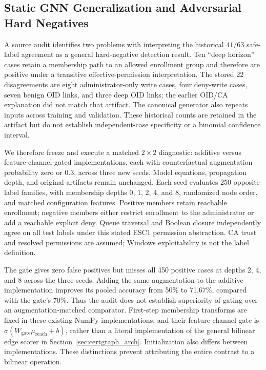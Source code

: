 \subsection{Static GNN Generalization and Adversarial Hard Negatives}
A source audit identifies two problems with interpreting the historical $41/63$ safe-label agreement as a general hard-negative detection result. Ten ``deep horizon'' cases retain a membership path to an allowed enrollment group and therefore are positive under a transitive effective-permission interpretation. The stored 22 disagreements are eight administrator-only write cases, four deny-write cases, seven benign OID links, and three deep OID links; the earlier OID/CA explanation did not match that artifact. The canonical generator also repeats inputs across training and validation. These historical counts are retained in the artifact but do not establish independent-case specificity or a binomial confidence interval.

We therefore freeze and execute a matched $2\times2$ diagnostic: additive versus feature-channel-gated implementations, each with counterfactual augmentation probability zero or 0.3, across three new seeds. Model equations, propagation depth, and original artifacts remain unchanged. Each seed evaluates 250 opposite-label families, with membership depths 0, 1, 2, 4, and 8, randomized node order, and matched configuration features. Positive members retain reachable enrollment; negative members either restrict enrollment to the administrator or add a reachable explicit deny. Queue traversal and Boolean closure independently agree on all test labels under this stated ESC1 permission abstraction. CA trust and resolved permissions are assumed; Windows exploitability is not the label definition.



The gate gives zero false positives but misses all 450 positive cases at depths 2, 4, and 8 across the three seeds. Adding the same augmentation to the additive implementation improves its pooled accuracy from 50\% to 71.67\%, compared with the gate's 70\%. Thus the audit does not establish superiority of gating over an augmentation-matched comparator. First-step membership transforms are fixed in these existing NumPy implementations, and their feature-channel gate is $\sigma(W_{\mathrm{gate}}\mu_{\mathrm{reach}}+b)$, rather than a literal implementation of the general bilinear edge scorer in Section~\ref{sec:certgraph_arch}. Initialization also differs between implementations. These distinctions prevent attributing the entire contrast to a bilinear operation.

